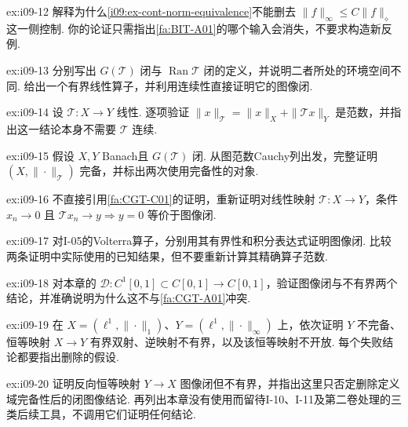\begin{FAExercise}[连续函数空间模型的一侧假设]{ex:i09-12}
解释为什么\autoref{i09:ex-cont-norm-equivalence}不能删去 \(\displaystyle \|f\|_\infty\leqslant C\|f\|_\diamond\) 这一侧控制. 你的论证只需指出\autoref{fa:BIT-A01}的哪个输入会消失，不要求构造新反例.
\end{FAExercise}

\begin{FAExercise}[闭图像与闭值域]{ex:i09-13}
分别写出 \(\displaystyle G(\mathcal T)\) 闭与 \(\displaystyle \operatorname{Ran}\mathcal T\) 闭的定义，并说明二者所处的环境空间不同. 给出一个有界线性算子，并利用连续性直接证明它的图像闭.
\end{FAExercise}

\begin{FAExercise}[图范数]{ex:i09-14}
设 \(\displaystyle \mathcal T:X\to Y\) 线性. 逐项验证 \(\displaystyle \|x\|_{\mathcal T}=\|x\|_X+\|\mathcal T x\|_Y\) 是范数，并指出这一结论本身不需要 \(\displaystyle \mathcal T\) 连续.
\end{FAExercise}

\begin{FAExercise}[图范数完备性]{ex:i09-15}
假设 \(\displaystyle X,Y\) Banach且 \(\displaystyle G(\mathcal T)\) 闭. 从图范数Cauchy列出发，完整证明 \(\displaystyle (X,\|\cdot\|_{\mathcal T})\) 完备，并标出两次使用完备性的对象.
\end{FAExercise}

\begin{FAExercise}[零序列判据]{ex:i09-16}
不直接引用\autoref{fa:CGT-C01}的证明，重新证明对线性映射 \(\displaystyle \mathcal T:X\to Y\)，条件 \(\displaystyle x_n\to0\) 且 \(\displaystyle \mathcal T x_n\to y\Rightarrow y=0\) 等价于图像闭.
\end{FAExercise}

\begin{FAExercise}[Volterra闭图像模板]{ex:i09-17}
对I-05的Volterra算子，分别用其有界性和积分表达式证明图像闭. 比较两条证明中实际使用的已知结果，但不要重新计算其精确算子范数.
\end{FAExercise}

\begin{FAExercise}[微分算子的定义域边界]{ex:i09-18}
对本章的 \(\displaystyle \mathcal D:C^1[0,1]\subset C[0,1]\to C[0,1]\)，验证图像闭与不有界两个结论，并准确说明为什么这不与\autoref{fa:CGT-A01}冲突.
\end{FAExercise}

\begin{FAExercise}[不完备陪域导致OMT与BIT失效]{ex:i09-19}
在 \(\displaystyle X=(\ell^1,\|\cdot\|_1)\)、\(\displaystyle Y=(\ell^1,\|\cdot\|_\infty)\) 上，依次证明 \(\displaystyle Y\) 不完备、恒等映射 \(\displaystyle X\to Y\) 有界双射、逆映射不有界，以及该恒等映射不开放. 每个失败结论都要指出删除的假设.
\end{FAExercise}

\begin{FAExercise}[闭图像失败与未来边界]{ex:i09-20}
证明反向恒等映射 \(\displaystyle Y\to X\) 图像闭但不有界，并指出这里只否定删除定义域完备性后的闭图像结论. 再列出本章没有使用而留待I-10、I-11及第二卷处理的三类后续工具，不调用它们证明任何结论.
\end{FAExercise}

